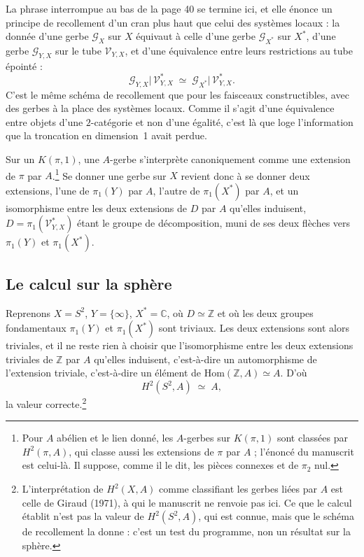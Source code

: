 \documentclass[11pt,a4paper]{article}
\begin{document}
La phrase interrompue au bas de la page 40 se termine ici, et elle énonce un
principe de recollement d'un cran plus haut que celui des systèmes locaux : la
donnée d'une gerbe $\mathcal{G}_{X}$ sur $X$ équivaut à celle d'une gerbe
$\mathcal{G}_{X^{*}}$ sur $X^{*}$, d'une gerbe $\mathcal{G}_{Y,X}$ sur le tube
$\mathcal{V}_{Y,X}$, et d'une équivalence entre leurs restrictions au tube
épointé :
\[
  \mathcal{G}_{Y,X}\bigl|\,\mathcal{V}^{*}_{Y,X} \;\simeq\;
  \mathcal{G}_{X^{*}}\bigl|\,\mathcal{V}^{*}_{Y,X}.
\]
C'est le même schéma de recollement que pour les faisceaux constructibles, avec
des gerbes à la place des systèmes locaux. Comme il s'agit d'une
équivalence entre objets d'une $2$-catégorie et non d'une égalité, c'est
là que loge l'information que la troncation en dimension~1 avait
perdue.

Sur un $K(\pi,1)$, une $A$-gerbe s'interprète canoniquement comme une extension
de $\pi$ par $A$.\footnote{Pour $A$ abélien et le lien donné, les $A$-gerbes sur
$K(\pi,1)$ sont classées par $H^{2}(\pi,A)$, qui classe aussi les extensions de
$\pi$ par $A$ ; l'énoncé du manuscrit est celui-là. Il suppose, comme il le dit,
les pièces connexes et de $\pi_{2}$ nul.} Se donner une gerbe sur $X$ revient
donc à se donner deux extensions, l'une de $\pi_{1}(Y)$ par $A$, l'autre de
$\pi_{1}(X^{*})$ par $A$, et un isomorphisme entre les deux extensions de $D$
par $A$ qu'elles induisent, $D = \pi_{1}(\mathcal{V}^{*}_{Y,X})$ étant le groupe
de décomposition, muni de ses deux flèches vers $\pi_{1}(Y)$ et
$\pi_{1}(X^{*})$.

\subsection*{Le calcul sur la sphère}

Reprenons $X = S^{2}$, $Y = \{\infty\}$, $X^{*} = \mathbb{C}$, où $D \simeq
\mathbb{Z}$ et où les deux groupes fondamentaux $\pi_{1}(Y)$ et
$\pi_{1}(X^{*})$ sont triviaux. Les deux extensions sont alors triviales, et il
ne reste rien à choisir que l'isomorphisme entre les deux extensions triviales
de $\mathbb{Z}$ par $A$ qu'elles induisent, c'est-à-dire un automorphisme de
l'extension triviale, c'est-à-dire un élément de
$\mathrm{Hom}(\mathbb{Z},A) \simeq A$. D'où
\[
  H^{2}(S^{2}, A) \;\simeq\; A,
\]
la valeur correcte.\footnote{L'interprétation de $H^{2}(X,A)$ comme classifiant
les gerbes liées par $A$ est celle de Giraud (1971), à qui le manuscrit ne
renvoie pas ici. Ce que le calcul établit n'est pas la valeur de
$H^{2}(S^{2},A)$, qui est connue, mais que le schéma de recollement la donne :
c'est un test du programme, non un résultat sur la sphère.}
\end{document}
